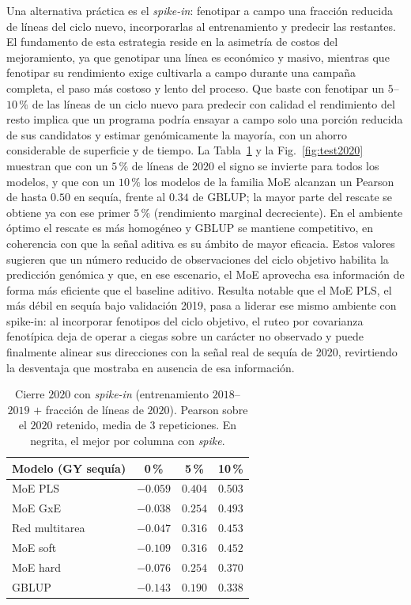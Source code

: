 \documentclass[conference]{IEEEtran}
\begin{document}
Una alternativa práctica es el \textit{spike-in}: fenotipar a campo una fracción reducida de líneas del ciclo nuevo, incorporarlas al entrenamiento y predecir las restantes. El fundamento de esta estrategia reside en la asimetría de costos del mejoramiento, ya que genotipar una línea es económico y masivo, mientras que fenotipar su rendimiento exige cultivarla a campo durante una campaña completa, el paso más costoso y lento del proceso. Que baste con fenotipar un $5$--$10\,\%$ de las líneas de un ciclo nuevo para predecir con calidad el rendimiento del resto implica que un programa podría ensayar a campo solo una porción reducida de sus candidatos y estimar genómicamente la mayoría, con un ahorro considerable de superficie y de tiempo. La Tabla~\ref{tab:test2020} y la Fig.~\ref{fig:test2020} muestran que con un $5\,\%$ de líneas de $2020$ el signo se invierte para todos los modelos, y que con un $10\,\%$ los modelos de la familia MoE alcanzan un Pearson de hasta $0.50$ en sequía, frente al $0.34$ de GBLUP; la mayor parte del rescate se obtiene ya con ese primer $5\,\%$ (rendimiento marginal decreciente). En el ambiente óptimo el rescate es más homogéneo y GBLUP se mantiene competitivo, en coherencia con que la señal aditiva es su ámbito de mayor eficacia. Estos valores sugieren que un número reducido de observaciones del ciclo objetivo habilita la predicción genómica y que, en ese escenario, el MoE aprovecha esa información de forma más eficiente que el baseline aditivo. Resulta notable que el MoE PLS, el más débil en sequía bajo validación 2019, pasa a liderar ese mismo ambiente con spike-in: al incorporar fenotipos del ciclo objetivo, el ruteo por covarianza fenotípica deja de operar a ciegas sobre un carácter no observado y puede finalmente alinear sus direcciones con la señal real de sequía de 2020, revirtiendo la desventaja que mostraba en ausencia de esa información.

\begin{table}[!t]
\renewcommand{\arraystretch}{1.2}
\caption{Cierre $2020$ con \textit{spike-in} (entrenamiento $2018$--$2019$ $+$ fracción de líneas de $2020$). Pearson sobre el $2020$ retenido, media de $3$ repeticiones. En negrita, el mejor por columna con \textit{spike}.}
\label{tab:test2020}
\centering
\footnotesize
\begin{tabular}{lccc}
\toprule
\textbf{Modelo (GY sequía)} & \textbf{0\,\%} & \textbf{5\,\%} & \textbf{10\,\%} \\
\midrule
MoE PLS        & $-0.059$ & $\mathbf{0.404}$ & $\mathbf{0.503}$ \\
MoE GxE        & $-0.038$ & $0.254$ & $0.493$ \\
Red multitarea & $-0.047$ & $0.316$ & $0.453$ \\
MoE soft       & $-0.109$ & $0.316$ & $0.452$ \\
MoE hard       & $-0.076$ & $0.254$ & $0.370$ \\
GBLUP          & $-0.143$ & $0.190$ & $0.338$ \\
\bottomrule
\end{tabular}
\end{table}
\end{document}
